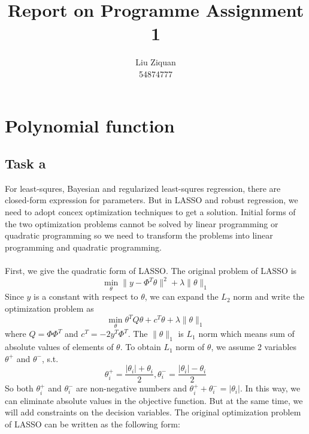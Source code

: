 \documentclass[a4paper]{article}
\begin{document}
\title{Report on Programme Assignment 1\footnotemark[1]}
\author{Liu Ziquan\\ 54874777}
\maketitle
\section{Polynomial function}
\subsection{Task a}
For least-squres, Bayesian and regularized least-squres regression, there are closed-form expression for parameters. But in LASSO and robust regression, we need to adopt concex optimization techniques to get a solution. Initial forms of the two optimization problems cannot be solved by linear programming or quadratic programming so we need to transform the problems into linear programming and quadratic programming.\\
\\
First, we give the quadratic form of LASSO. The original problem of LASSO is
\begin{equation}
  \min_{\theta}\| y-\Phi^T\theta \|^2+\lambda \| \theta \|_1
\end{equation}
Since $y$ is a constant with respect to $\theta$, we can expand the $L_2$ norm and write the optimization problem as
\begin{equation}
  \min_{\theta} \theta^TQ\theta+c^T\theta+\lambda \| \theta \|_1
\end{equation}
where $Q=\Phi \Phi^T$ and $c^T=-2y^T\Phi^T$. The $\| \theta \|_1$ is $L_1$ norm which means sum of absolute values of elements of $\theta$. To obtain $L_1$ norm of $\theta$, we assume 2 variables $\theta^+$ and $\theta^-$, s.t.
\begin{equation}
  \theta^+_i=\frac{|\theta_i|+\theta_i}{2},
  \theta^-_i=\frac{|\theta_i|-\theta_i}{2}
\end{equation}
So both $ \theta^+_i$ and $ \theta^-_i$ are non-negative numbers and $ \theta^+_i+ \theta^-_i=|\theta_i|$. In this way, we can eliminate absolute values in the objective function. But at the same time, we will add constraints on the decision variables. The original optimization problem of LASSO can be written as the following form:
\end{document}
